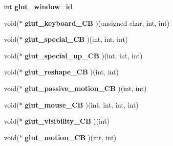 \begin{DoxyCompactItemize}
\item 
\hypertarget{class_g_l_u_i___glut___window_a1eeae65875356396ec81ffd63d0b096a}{int {\bfseries glut\+\_\+window\+\_\+id}}\label{class_g_l_u_i___glut___window_a1eeae65875356396ec81ffd63d0b096a}

\item 
\hypertarget{class_g_l_u_i___glut___window_a299ae81dcf534d460bac55a897cf540b}{void($\ast$ {\bfseries glut\+\_\+keyboard\+\_\+\+C\+B} )(unsigned char, int, int)}\label{class_g_l_u_i___glut___window_a299ae81dcf534d460bac55a897cf540b}

\item 
\hypertarget{class_g_l_u_i___glut___window_a6195cf472a03676f14c86e29a4d2ad5b}{void($\ast$ {\bfseries glut\+\_\+special\+\_\+\+C\+B} )(int, int, int)}\label{class_g_l_u_i___glut___window_a6195cf472a03676f14c86e29a4d2ad5b}

\item 
\hypertarget{class_g_l_u_i___glut___window_a1150c7cf65a2dcbbbac2f81f840f7f87}{void($\ast$ {\bfseries glut\+\_\+special\+\_\+up\+\_\+\+C\+B} )(int, int, int)}\label{class_g_l_u_i___glut___window_a1150c7cf65a2dcbbbac2f81f840f7f87}

\item 
\hypertarget{class_g_l_u_i___glut___window_ab80f91ef7790e98a3fb96f5d2fc3bcad}{void($\ast$ {\bfseries glut\+\_\+reshape\+\_\+\+C\+B} )(int, int)}\label{class_g_l_u_i___glut___window_ab80f91ef7790e98a3fb96f5d2fc3bcad}

\item 
\hypertarget{class_g_l_u_i___glut___window_afc4066e60731680d782efaed8a7bc3b1}{void($\ast$ {\bfseries glut\+\_\+passive\+\_\+motion\+\_\+\+C\+B} )(int, int)}\label{class_g_l_u_i___glut___window_afc4066e60731680d782efaed8a7bc3b1}

\item 
\hypertarget{class_g_l_u_i___glut___window_a126b91fbf4e55fd2a099bb43c5949654}{void($\ast$ {\bfseries glut\+\_\+mouse\+\_\+\+C\+B} )(int, int, int, int)}\label{class_g_l_u_i___glut___window_a126b91fbf4e55fd2a099bb43c5949654}

\item 
\hypertarget{class_g_l_u_i___glut___window_aaf80a162394308539654d8451d25d49b}{void($\ast$ {\bfseries glut\+\_\+visibility\+\_\+\+C\+B} )(int)}\label{class_g_l_u_i___glut___window_aaf80a162394308539654d8451d25d49b}

\item 
\hypertarget{class_g_l_u_i___glut___window_ae5f6057d61f1808b2b0ab39b89a7113e}{void($\ast$ {\bfseries glut\+\_\+motion\+\_\+\+C\+B} )(int, int)}\label{class_g_l_u_i___glut___window_ae5f6057d61f1808b2b0ab39b89a7113e}


\end{DoxyCompactItemize}
